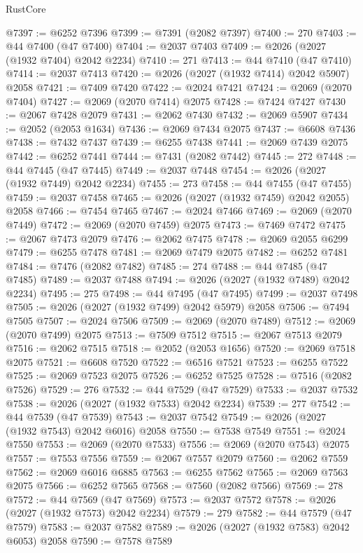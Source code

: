 \begin{lexlean}{RustCore}
\begin{coremodule}
@7397 := @6252 @7396
@7399 := @7391 (@2082 @7397)
@7400 := 270
@7403 := @44 @7400 (@47 @7400)
@7404 := @2037 @7403
@7409 := @2026 (@2027 (@1932 @7404) @2042 @2234)
@7410 := 271
@7413 := @44 @7410 (@47 @7410)
@7414 := @2037 @7413
@7420 := @2026 (@2027 (@1932 @7414) @2042 @5907) @2058
@7421 := @7409 @7420
@7422 := @2024 @7421
@7424 := @2069 (@2070 @7404)
@7427 := @2069 (@2070 @7414) @2075
@7428 := @7424 @7427
@7430 := @2067 @7428 @2079
@7431 := @2062 @7430
@7432 := @2069 @5907
@7434 := @2052 (@2053 @1634)
@7436 := @2069 @7434 @2075
@7437 := @6608 @7436
@7438 := @7432 @7437
@7439 := @6255 @7438
@7441 := @2069 @7439 @2075
@7442 := @6252 @7441
@7444 := @7431 (@2082 @7442)
@7445 := 272
@7448 := @44 @7445 (@47 @7445)
@7449 := @2037 @7448
@7454 := @2026 (@2027 (@1932 @7449) @2042 @2234)
@7455 := 273
@7458 := @44 @7455 (@47 @7455)
@7459 := @2037 @7458
@7465 := @2026 (@2027 (@1932 @7459) @2042 @2055) @2058
@7466 := @7454 @7465
@7467 := @2024 @7466
@7469 := @2069 (@2070 @7449)
@7472 := @2069 (@2070 @7459) @2075
@7473 := @7469 @7472
@7475 := @2067 @7473 @2079
@7476 := @2062 @7475
@7478 := @2069 @2055 @6299
@7479 := @6255 @7478
@7481 := @2069 @7479 @2075
@7482 := @6252 @7481
@7484 := @7476 (@2082 @7482)
@7485 := 274
@7488 := @44 @7485 (@47 @7485)
@7489 := @2037 @7488
@7494 := @2026 (@2027 (@1932 @7489) @2042 @2234)
@7495 := 275
@7498 := @44 @7495 (@47 @7495)
@7499 := @2037 @7498
@7505 := @2026 (@2027 (@1932 @7499) @2042 @5979) @2058
@7506 := @7494 @7505
@7507 := @2024 @7506
@7509 := @2069 (@2070 @7489)
@7512 := @2069 (@2070 @7499) @2075
@7513 := @7509 @7512
@7515 := @2067 @7513 @2079
@7516 := @2062 @7515
@7518 := @2052 (@2053 @1656)
@7520 := @2069 @7518 @2075
@7521 := @6608 @7520
@7522 := @6516 @7521
@7523 := @6255 @7522
@7525 := @2069 @7523 @2075
@7526 := @6252 @7525
@7528 := @7516 (@2082 @7526)
@7529 := 276
@7532 := @44 @7529 (@47 @7529)
@7533 := @2037 @7532
@7538 := @2026 (@2027 (@1932 @7533) @2042 @2234)
@7539 := 277
@7542 := @44 @7539 (@47 @7539)
@7543 := @2037 @7542
@7549 := @2026 (@2027 (@1932 @7543) @2042 @6016) @2058
@7550 := @7538 @7549
@7551 := @2024 @7550
@7553 := @2069 (@2070 @7533)
@7556 := @2069 (@2070 @7543) @2075
@7557 := @7553 @7556
@7559 := @2067 @7557 @2079
@7560 := @2062 @7559
@7562 := @2069 @6016 @6885
@7563 := @6255 @7562
@7565 := @2069 @7563 @2075
@7566 := @6252 @7565
@7568 := @7560 (@2082 @7566)
@7569 := 278
@7572 := @44 @7569 (@47 @7569)
@7573 := @2037 @7572
@7578 := @2026 (@2027 (@1932 @7573) @2042 @2234)
@7579 := 279
@7582 := @44 @7579 (@47 @7579)
@7583 := @2037 @7582
@7589 := @2026 (@2027 (@1932 @7583) @2042 @6053) @2058
@7590 := @7578 @7589

\end{coremodule}
\end{lexlean}
